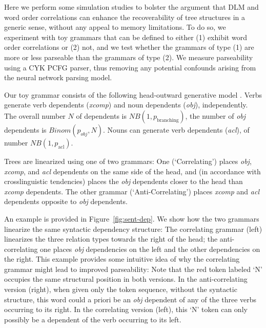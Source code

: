 \documentclass[10pt,twoside,lineno]{article}
\begin{document}
Here we perform some simulation studies to bolster the argument that DLM and word order correlations can enhance the recoverability of tree structures in a generic sense, without any appeal to memory limitations. To do so, we experiment with toy grammars that can be defined to either (1) exhibit word order correlations or (2) not, and we test whether the grammars of type (1) are more or less parseable than the grammars of type (2). We measure parseability using a CYK PCFG parser, thus removing any potential confounds arising from the neural network parsing model.

Our toy grammar consists of the following head-outward generative model \citep{eisner1996three}.
Verbs generate verb dependents (\emph{xcomp}) and noun dependents (\emph{obj}), independently.
The overall number $N$ of dependents is $NB(1, p_\text{branching})$, the number of \emph{obj} dependents is $Binom(p_{obj}, N)$.
Nouns can generate verb dependents (\emph{acl}), of number $NB(1, p_\text{acl})$.

Trees are linearized using one of two grammars: One (`Correlating') places \emph{obj}, \emph{xcomp}, and \emph{acl} dependents on the same side of the head, and (in accordance with crosslinguistic tendencies) places the \emph{obj} dependents closer to the head than \emph{xcomp} dependents.
The other grammar (`Anti-Correlating') places \emph{xcomp} and \emph{acl} dependents opposite to \emph{obj} dependents.

An example is provided in Figure~\ref{fig:sent-dep}.
We show how the two grammars linearize the same syntactic dependency structure:
The correlating grammar (left) linearizes the three relation types towards the right of the head; the anti-correlating one places \emph{obj} dependencies on the left and the other dependencies on the right.
This example provides some intuitive idea of why the correlating grammar might lead to improved parseability:
Note that the red token labeled `N' occupies the same structural position in both versions.
In the anti-correlating version (right), when given only the token sequence, without the syntactic structure, this word could a priori be an \emph{obj} dependent of any of the three verbs occurring to its right.
In the correlating version (left), this `N' token can only possibly be a dependent of the verb occurring to its left.
\end{document}
